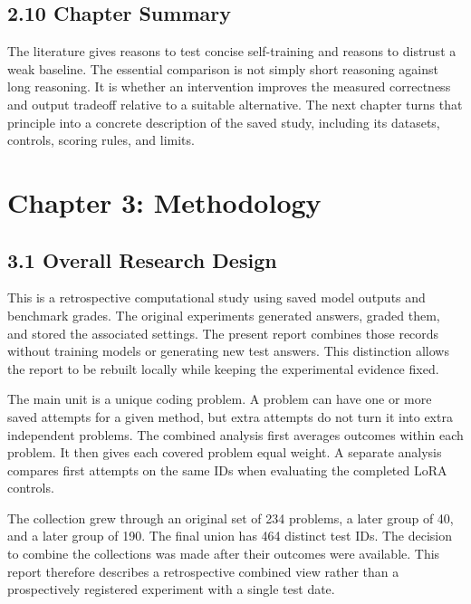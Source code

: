 \documentclass[11pt,letterpaper]{article}
\begin{document}
\subsection*{2.10 Chapter Summary}

The literature gives reasons to test concise self-training and reasons to distrust a weak baseline. The essential comparison is not simply short reasoning against long reasoning. It is whether an intervention improves the measured correctness and output tradeoff relative to a suitable alternative. The next chapter turns that principle into a concrete description of the saved study, including its datasets, controls, scoring rules, and limits.\par

\clearpage

\section*{Chapter 3: Methodology}

\subsection*{3.1 Overall Research Design}

This is a retrospective computational study using saved model outputs and benchmark grades. The original experiments generated answers, graded them, and stored the associated settings. The present report combines those records without training models or generating new test answers. This distinction allows the report to be rebuilt locally while keeping the experimental evidence fixed.\par

The main unit is a unique coding problem. A problem can have one or more saved attempts for a given method, but extra attempts do not turn it into extra independent problems. The combined analysis first averages outcomes within each problem. It then gives each covered problem equal weight. A separate analysis compares first attempts on the same IDs when evaluating the completed LoRA controls.\par

The collection grew through an original set of 234 problems, a later group of 40, and a later group of 190. The final union has 464 distinct test IDs. The decision to combine the collections was made after their outcomes were available. This report therefore describes a retrospective combined view rather than a prospectively registered experiment with a single test date.\par
\end{document}
